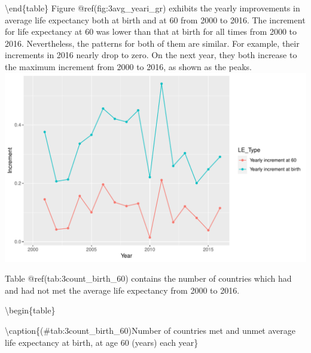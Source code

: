 \documentclass[11pt,a4paper,]{article}
\begin{document}
\textbackslash{}end\{table\}
Figure @ref(fig:3avg\_yeari\_gr) exhibits the yearly improvements in average life expectancy both at birth and at 60 from 2000 to 2016. The increment for life expectancy at 60 was lower than that at birth for all times from 2000 to 2016. Nevertheless, the patterns for both of them are similar. For example, their increments in 2016 nearly drop to zero. On the next year, they both increase to the maximum increment from 2000 to 2016, as shown as the peaks.
\includegraphics{ETC5513-assignment4_files/figure-latex/3avg_yeari_gr-1.pdf}

Table @ref(tab:3count\_birth\_60) contains the number of countries which had and had not met the average life expectancy from 2000 to 2016.

\textbackslash{}begin\{table\}

\textbackslash{}caption\{(\#tab:3count\_birth\_60)Number of countries met and unmet average life expectancy at birth, at age 60 (years) each year\}
\centering
\end{document}
